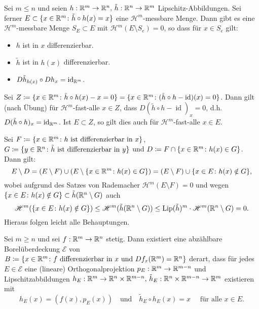 \documentclass[a4paper,twoside,DIV15,BCOR12mm]{scrbook}
\newcommand{\HM}{\mathscr H}
\DeclareMathOperator{\id}{id}
\DeclareMathOperator{\Lip}{Lip}
\begin{document}
\begin{lemma}\label{lem:3.13}
Sei \(m\leq n\) und seien \(h: \mathbb{R}^m\to\mathbb{R}^n,\, \tilde h: \mathbb{R}^n\to\mathbb{R}^m\) Lipschitz-Abbildungen. Sei ferner \(E \subset \{x\in\mathbb{R}^m\colon \tilde h \circ h (x) = x \}\) eine \(\HM^m\)-messbare Menge. Dann gibt es eine \(\HM^m\)-messbare Menge \(S_E \subset E\) mit \(\HM^m(E\setminus S_e) = 0\), so dass für \(x \in S_e\) gilt:
\begin{itemize}
\item \(h\) ist in \(x\) differenzierbar.
\item \(\tilde h\) ist in \(h(x)\) differenzierbar.
\item \(D\tilde h_{h(x)} \circ D  h_x = \id_{\MdR^m}\).
\end{itemize}
\end{lemma}
\begin{beweis}
Sei \(Z \da \{ x\in \MdR^m \colon \tilde h\circ h (x) - x = 0 \} = \{ x\in\MdR^m \colon (\tilde h\circ h-\id)(x) = 0 \}\). Dann gilt (nach Übung) für \(\HM^m\)-fast-alle \(x \in Z\), dass \(D(\tilde h \circ h - \id)_x = 0\), d.h. \(D(\tilde h \circ h)_x = \id_{\MdR^m}\). Ist \(E \subset Z\), so gilt dies auch für \(\HM^m\)-fast-alle \(x\in E\). 

Sei \(F \da \{x\in\MdR^m \colon h \text{ ist differenzierbar in } x\}\), \(G \da \{y\in\MdR^n \colon \tilde h \text{ ist differenzierbar in } y\}\) und \(D \da F \cap \{x\in\MdR^m \colon h(x)\in G\}\). Dann gilt:
\[
E\setminus D = (E\setminus F) \cup (E \setminus \{x\in\mathbb{R}^m \colon h(x) \in G\}) = (E\setminus F) \cup \{x\in E \colon h(x) \notin G\},
\]
wobei aufgrund des Satzes von Rademacher \(\HM^m(E\setminus F) = 0\) und wegen \(\{x\in E \colon h(x) \notin G\} \subset \tilde h(\mathbb{R}^n\setminus G)\) auch 
$$
\HM^m(\{x\in E \colon h(x) \notin G\}) \leq \HM^m(\tilde h(\MdR^n\setminus G)) \leq \Lip(\tilde h)^m \cdot \HM^m(\MdR^n\setminus G) = 0.
$$
Hieraus folgen leicht alle Behauptungen.
\end{beweis}

\begin{lemma}\label{lem:3.14}
Sei \(m\geq n\) und sei \(f: \mathbb{R}^m\to\mathbb{R}^n\) stetig. Dann existiert eine abzählbare Borelüberdeckung \(\mathcal E\) von \(B \da \{x\in\MdR^m \colon f\text{ differenzierbar in } x \text{ und } Df_x(\MdR^m)=\MdR^n\}\) derart, dass für jedes \(E \in \mathcal E\) eine (lineare) Orthogonalprojektion \(p_E: \mathbb{R}^m \to \mathbb{R}^{m-n}\) und Lipschitzabbildungen \(h_E: \mathbb{R}^m \to \mathbb{R}^n \times \mathbb{R}^{m-n},\, \tilde h_E:\mathbb{R}^n\times \mathbb{R}^{m-n} \to \mathbb{R}^m\) existieren mit
\[
h_E(x) = (f(x),p_E(x)) \quad \text{und} \quad \tilde h_E \circ h_E(x) = x \quad \text{ für alle } x\in E.
\]
\end{lemma}
\end{document}
